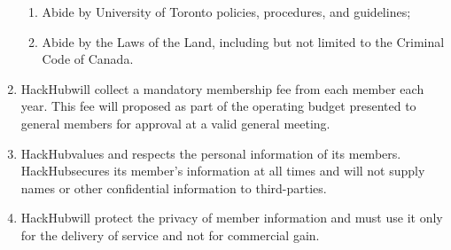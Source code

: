 \documentclass[12pt]{article}
\newcommand{\orgname}{HackHub\space}
\begin{document}
\begin{enumerate}[{3}.1]
\begin{enumerate}[{3.4}.1]
        \item	Abide by University of Toronto policies, procedures, and guidelines;
        \item	Abide by the Laws of the Land, including but not limited to the Criminal Code of Canada. 
    \end{enumerate}
    \item \orgname will collect a mandatory membership fee from each member each year. This fee will proposed as part of the operating budget presented to general members for approval at a valid general meeting. 
    \item \orgname values and respects the personal information of its members. \orgname secures its member’s information at all times and will not supply names or other confidential information to third-parties. 
    \item \orgname will protect the privacy of member information and must use it only for the delivery of service and not for commercial gain.
\end{enumerate}


\end{document}
